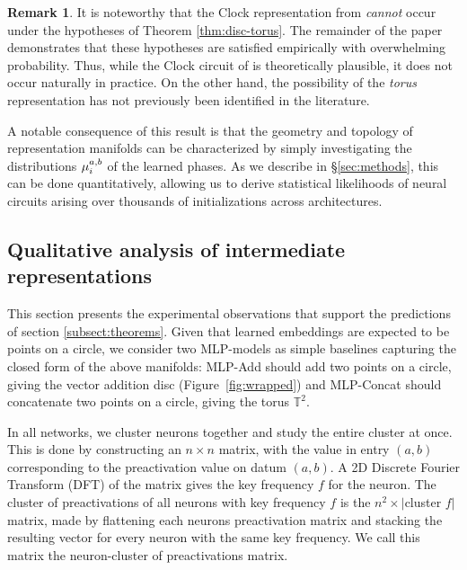 \documentclass{article} %
\theoremstyle{plain}
\theoremstyle{definition}
\newtheorem{remark}[theorem]{Remark}
\newtheorem{empirical fact}[theorem]{Empirical Fact}
\begin{document}
\begin{remark}
    It is noteworthy that the Clock representation from \citet{zhong2023the} \emph{cannot} occur under the hypotheses of Theorem \ref{thm:disc-torus}.
    The remainder of the paper demonstrates that these hypotheses are satisfied empirically with overwhelming probability.
    Thus, while the Clock circuit of \citet{zhong2023the} is theoretically plausible, it does not occur naturally in practice.
    On the other hand, the possibility of the \emph{torus} representation has not previously been identified in the literature.
\end{remark}

A notable consequence of this result is that the geometry and topology of representation manifolds can be characterized by simply investigating the distributions $\mu_{i}^{a, b}$ of the learned phases.
As we describe in \S\ref{sec:methods}, this can be done quantitatively, allowing us to derive statistical likelihoods of neural circuits arising over thousands of initializations across architectures.



\subsection{Qualitative analysis of intermediate representations}

This section presents the experimental observations that support the predictions of section \ref{subsect:theorems}. Given that learned embeddings are expected to be points on a circle, we consider two MLP-models as simple baselines capturing the closed form of the above manifolds: MLP-Add should add two points on a circle, giving the vector addition disc (Figure~\ref{fig:wrapped}) and MLP-Concat should concatenate two points on a circle, giving the torus $\mathbb{T}^2$. 

In all networks, we cluster neurons together and study the entire cluster at once. This is done by constructing an $n\times n$ matrix, with the value in entry $(a, b)$ corresponding to the preactivation value on datum $(a,b)$.
A 2D Discrete Fourier Transform (DFT) of the matrix gives the key frequency $f$ for the neuron.
The cluster of preactivations of all neurons with key frequency $f$ is the $n^2 \times |$cluster $f|$ matrix, made by flattening each neurons preactivation matrix and stacking the resulting vector for every neuron with the same key frequency. We call this matrix the neuron-cluster of preactivations matrix.
\end{document}

